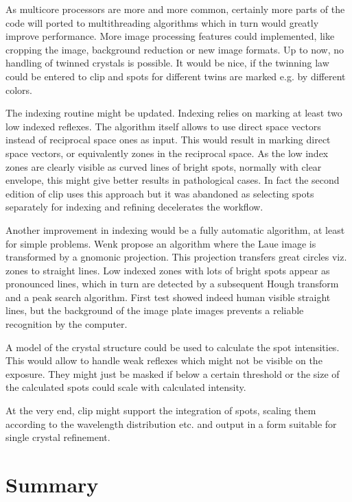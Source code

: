 As multicore processors are more and more common, certainly more parts
of the code will ported to multithreading algorithms which in turn
would greatly improve performance.  More image processing features
could implemented, like cropping the image, background reduction or
new image formats.  Up to now, no handling of twinned crystals is
possible. It would be nice, if the twinning law could be entered to
clip and spots for different twins are marked e.g. by different
colors.

The indexing routine might be updated. Indexing relies on marking at
least two low indexed reflexes. The algorithm itself allows to use
direct space vectors instead of reciprocal space ones as input. This
would result in marking direct space vectors, or equivalently zones in
the reciprocal space. As the low index zones are clearly visible as
curved lines of bright spots, normally with clear envelope, this might
give better results in pathological cases. In fact the second edition
of clip uses this approach but it was abandoned as selecting spots
separately for indexing and refining decelerates the workflow.

Another improvement in indexing would be a fully automatic algorithm,
at least for simple problems. Wenk \etal \cite{Wenk96} propose an
algorithm where the Laue image is transformed by a gnomonic
projection. This projection transfers great circles viz. zones to
straight lines. Low indexed zones with lots of bright spots appear as
pronounced lines, which in turn are detected by a subsequent Hough
transform and a peak search algorithm. First test showed indeed human
visible straight lines, but the background of the image plate images
prevents a reliable recognition by the computer.

A model of the crystal structure could be used to calculate the 
spot intensities. This would allow to handle weak reflexes which might
not be visible on the exposure. They might just be masked if below a
certain threshold or the size of the calculated spots could scale with
calculated intensity.

At the very end, clip might support the integration of spots, scaling
them according to the wavelength distribution etc. and output in a
form suitable for single crystal refinement.



\section{Summary}

